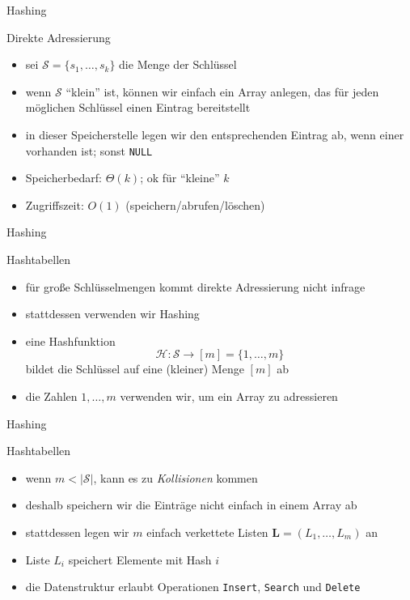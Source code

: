 \documentclass[aspectratio=1610, 11pt]{beamer}
\renewcommand{\vec}[1]{\boldsymbol{#1}}
\newcommand\NULL{{\tt NULL}}
\newcommand\cH{\mathcal H}
\newcommand\cS{\mathcal S}
\newcommand\vL{\vec L}
\begin{document}
\begin{frame}{Hashing}
	\begin{exampleblock}{Direkte Adressierung}
		\begin{itemize}
			\item sei $\cS=\{s_1,\ldots,s_k\}$ die Menge der Schl\"ussel
			\item wenn $\cS$ ``klein'' ist, k\"onnen wir einfach ein Array anlegen, das f\"ur jeden m\"oglichen Schl\"ussel einen Eintrag bereitstellt
			\item in dieser Speicherstelle legen wir den entsprechenden Eintrag ab, wenn einer vorhanden ist; sonst \NULL
			\item \alert{Speicherbedarf:} $\Theta(k)$; ok f\"ur ``kleine'' $k$
			\item \alert{Zugriffszeit:} $O(1)$ (speichern/abrufen/l\"oschen)
		\end{itemize}
	\end{exampleblock}
\end{frame}

\begin{frame}{Hashing}
	\begin{exampleblock}{Hashtabellen}
		\begin{itemize}
			\item f\"ur gro\ss e Schl\"usselmengen kommt direkte Adressierung nicht infrage
			\item stattdessen verwenden wir \alert{Hashing}
			\item eine \alert{Hashfunktion}
				$$\cH:\cS\to[m]=\{1,\ldots,m\}$$
				bildet die Schl\"ussel auf eine (kleiner) Menge $[m]$ ab
			\item die Zahlen $1,\ldots,m$ verwenden wir, um ein Array zu adressieren
		\end{itemize}
	\end{exampleblock}
\end{frame}

\begin{frame}{Hashing}
	\begin{exampleblock}{Hashtabellen}
		\begin{itemize}
			\item wenn $m<|\cS|$, kann es zu \emph{Kollisionen} kommen
			\item deshalb speichern wir die Eintr\"age nicht einfach in einem Array ab
			\item stattdessen legen wir $m$ einfach verkettete Listen $\vL=(L_1,\ldots,L_m)$ an
			\item Liste $L_i$ speichert Elemente mit Hash $i$
			\item die Datenstruktur erlaubt Operationen {\tt Insert}, {\tt Search} und {\tt Delete}
		\end{itemize}
	\end{exampleblock}
\end{frame}
\end{document}
